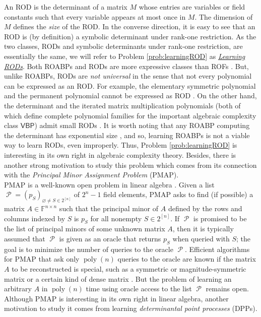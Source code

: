 \documentclass[11pt,letterpaper]{article}
\newcommand{\F}{\mathbb{F}}
\DeclareMathOperator{\calP}{\mathcal{P}}
\DeclareMathOperator*{\pol}{poly}
\begin{document}
  An ROD is the determinant of a matrix $M$ whose entries are variables or field constants such that every variable appears at most once in $M$. The dimension of $M$ defines the \emph{size} of the ROD. In the converse direction, it is easy to see that an ROD is (by definition) a symbolic determinant under rank-one restriction. As the two classes, RODs and symbolic determinants under rank-one restriction, are essentially the same, we will refer to Problem \ref{prob:learningROD} as \underline{\emph{Learning RODs}}. Both ROABPs and RODs are more expressive classes than ROFs \cite{Valiant79a}. But, unlike ROABPs, RODs are \emph{not universal} in the sense that not every polynomial can be expressed as an ROD. For example, the elementary symmetric polynomial and the permanent polynomial cannot be expressed as ROD \cite{AravindJ15}. On the other hand, the determinant and the iterated matrix multiplication polynomials (both of which define complete polynomial families for the important algebraic complexity class $\mathsf{VBP}$) admit small RODs \cite{Valiant79a}. It is worth noting that any ROABP computing the determinant has exponential size \cite{Nisan91}, and so, learning ROABPs is not a viable way to learn RODs, even improperly. Thus, Problem \ref{prob:learningROD} is interesting in its own right in algebraic complexity theory. Besides, there is another strong motivation to study this problem which comes from its connection with the \emph{Principal Minor Assignment Problem} (PMAP).  \\

 PMAP is a well-known open problem in linear algebra \cite{HS02, GriffinTsatsomeros2006}. Given a list $\calP = (p_S)_{\varnothing \neq S \in 2^{[n]}}$ of $2^n - 1$ field elements, PMAP asks to find (if possible) a matrix $A \in \F^{n \times n}$ such that the principal minor of $A$ defined by the rows and columns indexed by $S$ is $p_S$ for all nonempty $S \in 2^{[n]}$. If $\calP$ is promised to be the list of principal minors of some unknown matrix $A$, then it is typically assumed that $\calP$ is given as an oracle that returns $p_S$ when queried with $S$; the goal is to minimize the number of queries to the oracle $\calP$. Efficient algorithms for PMAP that ask only $\pol(n)$ queries to the oracle are known if the matrix $A$ to be reconstructed is special, such as a symmetric or magnitude-symmetric matrix \cite{RisingKuleszaTaskar2015, Brunel2018, BrunelUrschel2024} or a certain kind of dense matrix \cite{GriffinTsatsomeros2006}. But the problem of learning an arbitrary $A$ in $\pol(n)$ time using oracle access to the list $\calP$ remains open. Although PMAP is interesting in its own right in linear algebra, another motivation to study it comes from learning \emph{determinantal point processes} (DPPs).
\end{document}
